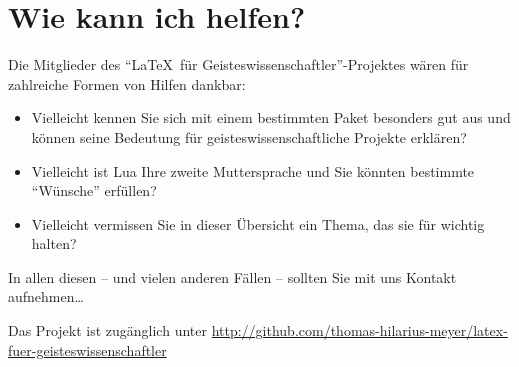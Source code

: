\documentclass[ngerman]{dtk}
\begin{document}
\section{Wie kann ich helfen?}

Die Mitglieder des \enquote{\LaTeX\ für Geisteswissenschaftler}-Projektes wären für zahlreiche Formen von
Hilfen dankbar:

\begin{itemize}
    \item Vielleicht kennen Sie sich mit einem bestimmten Paket besonders gut aus und können seine Bedeutung
        für geisteswissenschaftliche Projekte erklären?
    \item Vielleicht ist Lua Ihre zweite Muttersprache und Sie könnten bestimmte \enquote{Wünsche} erfüllen?
    \item Vielleicht vermissen Sie in dieser Übersicht ein Thema, das sie für wichtig halten?
\end{itemize} 

In allen diesen -- und vielen anderen Fällen -- sollten Sie mit uns Kontakt aufnehmen\ldots

Das Projekt ist zugänglich unter \url{http://github.com/thomas-hilarius-meyer/latex-fuer-geisteswissenschaftler}
\end{document}
